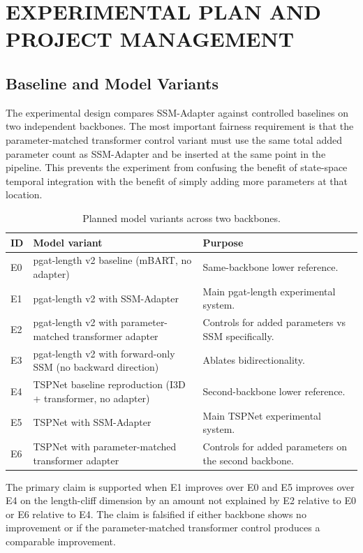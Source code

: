 \setlength{\footskip}{8mm}

\chapter{EXPERIMENTAL PLAN AND PROJECT MANAGEMENT}

\section{Baseline and Model Variants}

The experimental design compares SSM-Adapter against controlled baselines on two independent backbones. The most important fairness requirement is that the parameter-matched transformer control variant must use the same total added parameter count as SSM-Adapter and be inserted at the same point in the pipeline. This prevents the experiment from confusing the benefit of state-space temporal integration with the benefit of simply adding more parameters at that location.

\begin{table}[h]
\caption{Planned model variants across two backbones.}
\begin{center}
\begin{tabular}{p{0.55in}p{2.8in}p{2.3in}}
\toprule
ID & Model variant & Purpose \\
\midrule
E0 & pgat-length v2 baseline (mBART, no adapter) & Same-backbone lower reference. \\
E1 & pgat-length v2 with SSM-Adapter & Main pgat-length experimental system. \\
E2 & pgat-length v2 with parameter-matched transformer adapter & Controls for added parameters vs SSM specifically. \\
E3 & pgat-length v2 with forward-only SSM (no backward direction) & Ablates bidirectionality. \\
E4 & TSPNet baseline reproduction (I3D + transformer, no adapter) & Second-backbone lower reference. \\
E5 & TSPNet with SSM-Adapter & Main TSPNet experimental system. \\
E6 & TSPNet with parameter-matched transformer adapter & Controls for added parameters on the second backbone. \\
\bottomrule
\end{tabular}
\label{tab:model-variants}
\end{center}
\end{table}

The primary claim is supported when E1 improves over E0 and E5 improves over E4 on the length-cliff dimension by an amount not explained by E2 relative to E0 or E6 relative to E4. The claim is falsified if either backbone shows no improvement or if the parameter-matched transformer control produces a comparable improvement.

